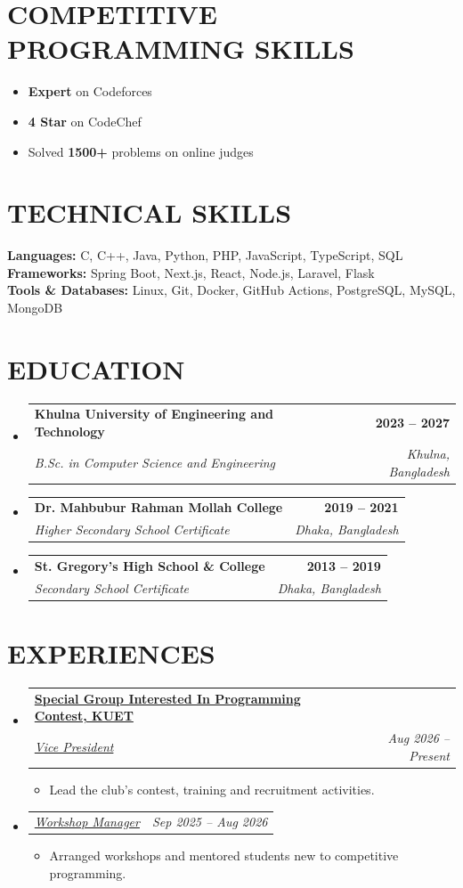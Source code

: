 \documentclass[letterpaper,10pt]{article}
\makeatletter
\newcommand{\resumeItem}[1]{
  \item\small{{#1}}
}
\newcommand{\resumeSubheading}[4]{
  \vspace{-2pt}\item
  \begin{tabular*}{1.0\textwidth}[t]{l@{\extracolsep{\fill}}r}
    \textbf{\large#1} & \textbf{\small #2} \\
    \textit{\large#3} & \textit{\small #4} \\
  \end{tabular*}\vspace{-4pt}
}
\newcommand{\resumeSubSubheading}[2]{
  \item
  \begin{tabular*}{1.0\textwidth}{l@{\extracolsep{\fill}}r}
    \textit{\large#1} & \textit{\small #2} \\
  \end{tabular*}\vspace{-4pt}
}
\newcommand{\resumeSubHeadingListStart}{\begin{itemize}[leftmargin=0.0in, label={}]}
\newcommand{\resumeSubHeadingListEnd}{\end{itemize}}
\newcommand{\resumeItemListStart}{\begin{itemize}[leftmargin=0.2in, topsep=2pt, itemsep=1pt, parsep=0pt, partopsep=0pt]}
\newcommand{\resumeItemListEnd}{\end{itemize}\vspace{2pt}}
\makeatother
\begin{document}
\section{COMPETITIVE PROGRAMMING SKILLS}
\begin{itemize}[leftmargin=0.2in, itemsep=0pt, parsep=2pt, topsep=3pt]
    \item \textbf{Expert} on Codeforces
    \item \textbf{4 Star} on CodeChef
    \item Solved \textbf{1500+} problems on online judges
\end{itemize}
\vspace{-8pt}

\section{TECHNICAL SKILLS}
\begin{itemize}[leftmargin=0.2in, label={}]
  \small{\item{
    \textbf{\normalsize{Languages:}}{ \normalsize{ C, C++, Java, Python, PHP, JavaScript, TypeScript, SQL}} \\
    \textbf{\normalsize{Frameworks:}}{\normalsize{ Spring Boot, Next.js, React, Node.js, Laravel, Flask}} \\
    \textbf{\normalsize{Tools \& Databases:}}{\normalsize{ Linux, Git, Docker, GitHub Actions, PostgreSQL, MySQL, MongoDB}} \\
  }}
\end{itemize}
\vspace{-15pt}

\section{EDUCATION}
\resumeSubHeadingListStart
  \resumeSubheading
    {Khulna University of Engineering and Technology}{2023 -- 2027}
    {B.Sc. in Computer Science and Engineering}{Khulna, Bangladesh}
  \resumeSubheading
    {Dr. Mahbubur Rahman Mollah College}{2019 -- 2021}
    {Higher Secondary School Certificate}{Dhaka, Bangladesh}
  \resumeSubheading
    {St. Gregory's High School \& College}{2013 -- 2019}
    {Secondary School Certificate}{Dhaka, Bangladesh}
\resumeSubHeadingListEnd
\vspace{-12pt}

\section{EXPERIENCES}
\resumeSubHeadingListStart
  \resumeSubheading
    {\href{https://www.facebook.com/sgipc.kuet}{Special Group Interested In Programming Contest, KUET}}{}
    {\underline{Vice President}}{Aug 2026 -- Present}
  \resumeItemListStart
    \resumeItem{\normalsize{Lead the club's contest, training and recruitment activities.}}
  \resumeItemListEnd
  \vspace{-5pt}
  \resumeSubSubheading
    {\underline{Workshop Manager}}{Sep 2025 -- Aug 2026}
  \resumeItemListStart
    \resumeItem{\normalsize{Arranged workshops and mentored students new to competitive programming.}}
  \resumeItemListEnd
\resumeSubHeadingListEnd
\end{document}
